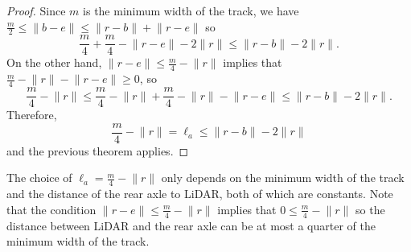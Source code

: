 \begin{proof}
Since $m$ is the minimum width of the track, we have 
$\frac{m}{2} 
\leq  \lVert b-e \rVert
\leq \lVert r-b \rVert + \lVert r-e \rVert$
so
$$\frac{m}{4} + \frac{m}{4} - \lVert r-e \rVert - 2 \lVert r \rVert
\leq \lVert r-b \rVert - 2 \lVert r \rVert.
$$
%
On the other hand, 
$\lVert r-e \rVert \leq \frac{m}{4} - \lVert r \rVert $ 
implies that 
$ \frac{m}{4} - \lVert r \rVert - \lVert r-e \rVert \geq 0$,
so
$$\frac{m}{4} - \lVert r \rVert 
\leq \frac{m}{4} - \lVert r \rVert + \frac{m}{4} - \lVert r \rVert - \lVert r-e \rVert 
\leq \lVert r-b \rVert - 2 \lVert r \rVert.
$$
%
Therefore,
$$\frac{m}{4} - \lVert r \rVert 
= \ell_a
\leq \lVert r-b \rVert - 2 \lVert r \rVert
$$
and the previous theorem applies.
\end{proof}

The choice of $\ell_a = \frac{m}{4} - \lVert r \rVert$ only depends on the minimum width of the track and the distance of the rear axle to LiDAR, both of which are constants.
%
Note that the condition $\lVert r-e \rVert \leq \frac{m}{4} - \lVert r \rVert $ implies that $0 \leq \frac{m}{4} - \lVert r \rVert $ so the distance between LiDAR and the rear axle can be at most a quarter of the minimum width of the track.
